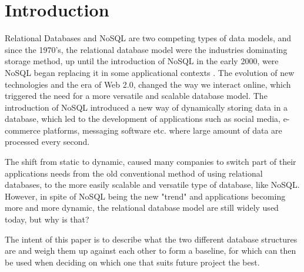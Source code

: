 \section{Introduction}
Relational Databases and NoSQL are two competing types of data models, and since the 1970's, the relational database model were the industries dominating storage method, up until the introduction of NoSQL in the early 2000, were NoSQL began replacing it in some applicational contexts \parencite{a-brief-history-on-non-relational-databases}.   
The evolution of new technologies and the era of Web 2.0, changed the way we interact online, which triggered the need for a more versatile and scalable database model\parencite{a-brief-history-of-nosql}.  
The introduction of NoSQL introduced a new way of dynamically storing data in a database, which led to the development of applications such as social media, e-commerce platforms, messaging software etc. where large amount of data are processed every second.

The shift from static to dynamic, caused many companies to switch part of their applications needs from the old conventional method of using relational databases, to the more easily scalable and versatile type of database, like NoSQL.
However, in spite of NoSQL being the new "trend" and applications becoming more and more dynamic, the relational database model are still widely used today, but why is that?

The intent of this paper is to describe what the two different database structures are and weigh them up against each other to form a baseline, for which can then be used when deciding on which one that suits future project the best.